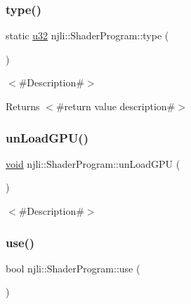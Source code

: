 \mbox{\label{classnjli_1_1_shader_program_a92e24de59f2e44318baab955895910ba}} 
\subsubsection{\texorpdfstring{type()}{type()}}
{\footnotesize\ttfamily static \mbox{\hyperlink{_util_8h_a10e94b422ef0c20dcdec20d31a1f5049}{u32}} njli\+::\+Shader\+Program\+::type (\begin{DoxyParamCaption}{ }\end{DoxyParamCaption})\hspace{0.3cm}{\ttfamily [static]}}

$<$\#\+Description\#$>$

\begin{DoxyReturn}{Returns}
$<$\#return value description\#$>$ 
\end{DoxyReturn}
\mbox{\label{classnjli_1_1_shader_program_af93d37d88d0d56ae1dfe0a902ec7391e}} 
\subsubsection{\texorpdfstring{un\+Load\+G\+P\+U()}{unLoadGPU()}}
{\footnotesize\ttfamily \mbox{\hyperlink{_thread_8h_af1e856da2e658414cb2456cb6f7ebc66}{void}} njli\+::\+Shader\+Program\+::un\+Load\+G\+PU (\begin{DoxyParamCaption}{ }\end{DoxyParamCaption})}

$<$\#\+Description\#$>$ \mbox{\label{classnjli_1_1_shader_program_a1295b3e2656bc24f485dc97a7d920b67}} 
\subsubsection{\texorpdfstring{use()}{use()}}
{\footnotesize\ttfamily bool njli\+::\+Shader\+Program\+::use (\begin{DoxyParamCaption}{ }\end{DoxyParamCaption})}


